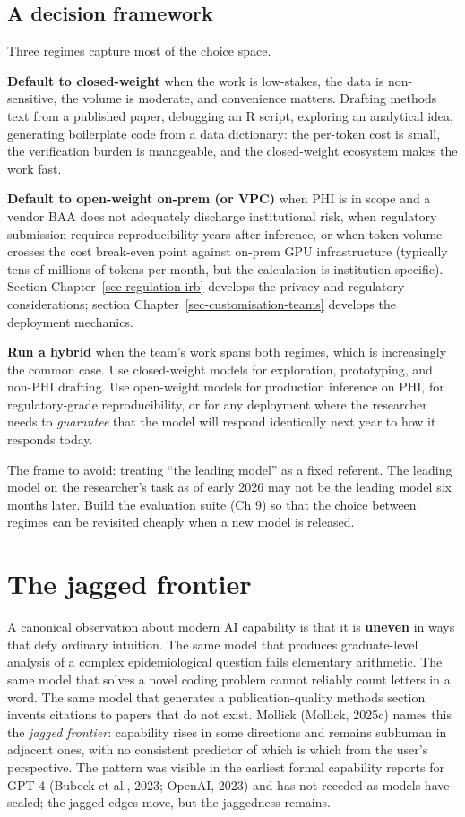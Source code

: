 \documentclass[
  letterpaper,
  11pt]{scrbook}
\begin{document}
\subsection{A decision framework}\label{a-decision-framework}

Three regimes capture most of the choice space.

\textbf{Default to closed-weight} when the work is low-stakes, the data
is non-sensitive, the volume is moderate, and convenience matters.
Drafting methods text from a published paper, debugging an R script,
exploring an analytical idea, generating boilerplate code from a data
dictionary: the per-token cost is small, the verification burden is
manageable, and the closed-weight ecosystem makes the work fast.

\textbf{Default to open-weight on-prem (or VPC)} when PHI is in scope
and a vendor BAA does not adequately discharge institutional risk, when
regulatory submission requires reproducibility years after inference, or
when token volume crosses the cost break-even point against on-prem GPU
infrastructure (typically tens of millions of tokens per month, but the
calculation is institution-specific). Section
Chapter~\ref{sec-regulation-irb} develops the privacy and regulatory
considerations; section Chapter~\ref{sec-customisation-teams} develops
the deployment mechanics.

\textbf{Run a hybrid} when the team's work spans both regimes, which is
increasingly the common case. Use closed-weight models for exploration,
prototyping, and non-PHI drafting. Use open-weight models for production
inference on PHI, for regulatory-grade reproducibility, or for any
deployment where the researcher needs to \emph{guarantee} that the model
will respond identically next year to how it responds today.

The frame to avoid: treating ``the leading model'' as a fixed referent.
The leading model on the researcher's task as of early 2026 may not be
the leading model six months later. Build the evaluation suite (Ch 9) so
that the choice between regimes can be revisited cheaply when a new
model is released.

\section{The jagged frontier}\label{the-jagged-frontier}

A canonical observation about modern AI capability is that it is
\textbf{uneven} in ways that defy ordinary intuition. The same model
that produces graduate-level analysis of a complex epidemiological
question fails elementary arithmetic. The same model that solves a novel
coding problem cannot reliably count letters in a word. The same model
that generates a publication-quality methods section invents citations
to papers that do not exist. Mollick (Mollick, 2025c) names this the
\emph{jagged frontier}: capability rises in some directions and remains
subhuman in adjacent ones, with no consistent predictor of which is
which from the user's perspective. The pattern was visible in the
earliest formal capability reports for GPT-4 ({Bubeck et al.}, 2023;
OpenAI, 2023) and has not receded as models have scaled; the jagged
edges move, but the jaggedness remains.
\end{document}
